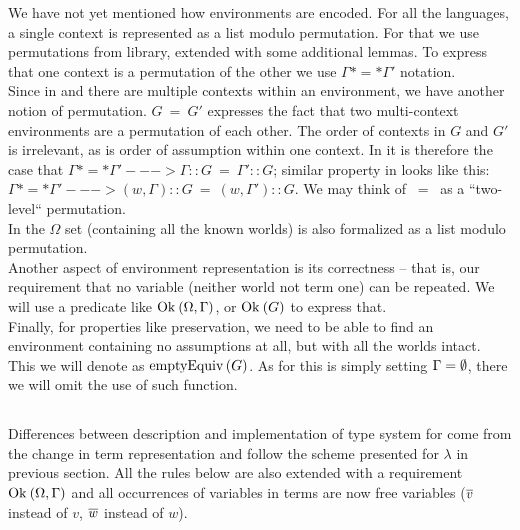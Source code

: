 We have not yet mentioned how environments are encoded. For all the languages, a single context is represented as a list modulo permutation. For that we use permutations from \tlc{} library, extended with some additional lemmas. To express that one context is a permutation of the other we use $ \Gamma *=* \Gamma'$ notation.\\
Since in \langLF{} and \langHyb{} there are multiple contexts within an environment, we have another notion of permutation. $G ~=~ G'$ expresses the fact that two multi-context environments are a permutation of each other. The order of contexts in $G$ and $G'$ is irrelevant, as is order of assumption within one context. In \langLF{} it is therefore the case that $ \Gamma *=* \Gamma' ---> \Gamma :: G ~=~ \Gamma' :: G$; similar property in \langHyb{} looks like this: $ \Gamma *=* \Gamma' ---> (w, \Gamma) :: G ~=~ (w, \Gamma') :: G$. We may think of $~=~$ as a ``two-level`` permutation.\\
In \langL{} the $\Omega$ set (containing all the known worlds) is also formalized as a list modulo permutation.\\

Another aspect of environment representation is its correctness -- that is, our requirement that no variable (neither world not term one) can be repeated. We will use a predicate like $\mbox{$\operatorname{Ok}_{}{(\Omega, \Gamma)}$}$,  or $\mbox{$\operatorname{Ok}_{}{(G)}$}$ to express that.\\

Finally, for properties like preservation, we need to be able to find an environment containing no assumptions at all, but with all the worlds intact. This we will denote as $\mbox{$\operatorname{emptyEquiv}{(G)}$}$. As for \langL{} this is simply setting $\Gamma = \mbox{$\emptyset$}$, there we will omit the use of such function.

\subsection{\langL{}}

Differences between description and implementation of type system for \langL{} come from the change in term representation and follow the scheme presented for $\lambda$ in previous section. All the rules below are also extended with a requirement $\mbox{$\operatorname{Ok}_{}{(\Omega, \Gamma)}$}$ and all occurrences of variables in terms are now free variables ($\overline{v}$ instead of $v$, $\overline{w}$ instead of $w$).\\

